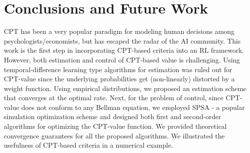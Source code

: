 \documentclass[11pt,letterpaper,english]{article}
\begin{document}
% 

\section{Conclusions and Future Work}
\label{sec:conclusions}
CPT has been a very popular paradigm for modeling human decisions among psychologists/economists, but has escaped the radar of the AI community. This work is the first step in incorporating CPT-based criteria into an RL framework. However, both estimation and control of CPT-based value is challenging. Using temporal-difference learning type algorithms for estimation was ruled out for CPT-value since the underlying probabilities get (non-linearly) distorted by a weight function. Using empirical distributions, we proposed an estimation scheme that converges at the optimal rate. Next, for the problem of control, since CPT-value does not conform to any Bellman equation, we employed SPSA - a popular simulation optimization scheme and designed both first and second-order algorithms for optimizing the CPT-value function. 
We provided theoretical convergence guarantees for all the proposed algorithms. We illustrated the usefulness of CPT-based criteria in a numerical example.




% 

\end{document}
